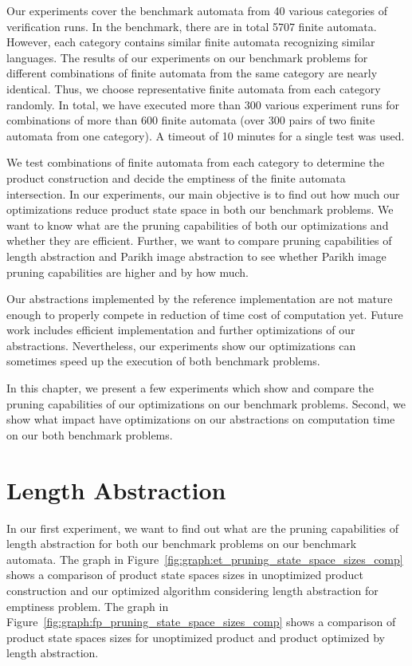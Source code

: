 Our experiments cover the benchmark automata from 40 various categories of verification runs. In the benchmark, there are in total 5707 finite automata. However, each category contains similar finite automata recognizing similar languages. The results of our experiments on our benchmark problems for different combinations of finite automata from the same category are nearly identical. Thus, we choose representative finite automata from each category randomly. In total, we have executed more than 300 various experiment runs for combinations of more than 600 finite automata (over 300 pairs of two finite automata from one category). A timeout of 10 minutes for a single test was used.

We test combinations of finite automata from each category to determine the product construction and decide the emptiness of the finite automata intersection. In our experiments, our main objective is to find out how much our optimizations reduce product state space in both our benchmark problems. We want to know what are the pruning capabilities of both our optimizations and whether they are efficient. Further, we want to compare pruning capabilities of length abstraction and Parikh image abstraction to see whether Parikh image pruning capabilities are higher and by how much.

Our abstractions implemented by the reference implementation are not mature enough to properly compete in reduction of time cost of computation yet. Future work includes efficient implementation and further optimizations of our abstractions. Nevertheless, our experiments show our optimizations can sometimes speed up the execution of both benchmark problems.

In this chapter, we present a few experiments which show and compare the pruning capabilities of our optimizations on our benchmark problems. Second, we show what impact have optimizations on our abstractions on computation time on our both benchmark problems.

\section{Length Abstraction}

In our first experiment, we want to find out what are the pruning capabilities of length abstraction for both our benchmark problems on our benchmark automata. The graph in Figure~\ref{fig:graph:et_pruning_state_space_sizes_comp} shows a comparison of product state spaces sizes in unoptimized product construction and our optimized algorithm considering length abstraction for emptiness problem. The graph in Figure~\ref{fig:graph:fp_pruning_state_space_sizes_comp} shows a comparison of product state spaces sizes for unoptimized product and product optimized by length abstraction.

